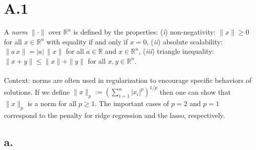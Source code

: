 \documentclass{article}
\newcommand{\field}[1]{\mathbb{#1}}
\newcommand{\1}{\mathbf{1}}
\newcommand{\R}{\field{R}} %
\begin{document}
\section*{A.1}
{\Large

A \emph{norm} $\|\cdot\|$ over $\R^n$ is defined by the properties:
(\textit{i}) non-negativity: $\|x\|\geq 0$ for all $x \in \R^n$ with equality if and only if $x=0$,
(\textit{ii}) absolute scalability: $\|a \, x\| = |a| \, \|x\|$ for all $a \in \R$ and $x \in \R^n$, 
(\textit{iii}) triangle inequality: $\|x+y\| \leq \|x\| + \|y\|$ for all $x,y \in \R^n$. \\ \\

Context: norms are often used in regularization to encourage specific behaviors of solutions. If we define  $\| x \|_p := \left( \sum_{i=1}^n |x_i|^{p} \right)^{1/p}$ then one can show that $\| x \|_p$ is a norm for all $p \geq 1$. The important cases of $p=2$ and $p=1$ correspond to the penalty for ridge regression and the lasso, respectively.

\subsection*{a.}

}
\end{document}
